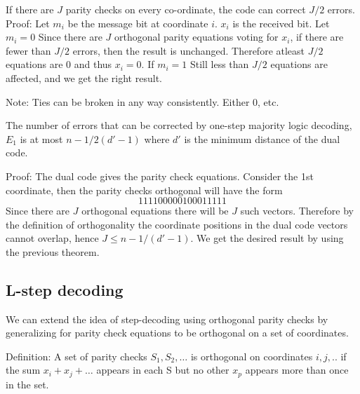 \documentclass{article}
\begin{document}
\begin{Theorem} 
If there are $J$ parity checks on every co-ordinate, the code can correct $J/2$ errors.
Proof: 
Let $m_i$ be the message bit at coordinate $i$. $x_i$ is the received bit. 
Let $m_i=0$
Since there are $J$ orthogonal parity equations voting for $x_i$, if there are fewer than $J/2$ errors, then the result is unchanged. Therefore atleast $J/2$ equations are $0$ and thus $x_i=0$.
If $m_i=1$
Still less than $J/2$ equations are affected, and we get the right result.
\end{Theorem}

Note: Ties can be broken in any way consistently. Either $0$, etc.

\begin{Theorem}
The number of errors that can be corrected by one-step majority logic decoding, $E_1$ is at most $n-1/2(d'-1)$ where $d'$ is the minimum distance of the dual code.

Proof: The dual code gives the parity check equations. 
Consider the 1st coordinate, then the parity checks orthogonal will have the form
\begin{equation*}
1  1 1 1  0 0 0 0 0
1  0 0 0  1 1 1 1 1 
\end{equation*}
Since there are $J$ orthogonal equations there will be $J$ such vectors.
Therefore by the definition of orthogonality the coordinate positions in the dual code vectors cannot overlap, hence $J \leq n-1/(d'-1) $.
We get the desired result by using the previous theorem.
\end{Theorem}

\subsection{L-step decoding}
We can extend the idea of step-decoding using orthogonal parity checks by generalizing for parity check equations to be orthogonal on a set of coordinates. 

Definition: A set of parity checks $S_1, S_2,\ldots$ is orthogonal on coordinates $i,j,..$ if the sum $x_i+x_j+\ldots$ appears in each S but no other $x_p$ appears more than once in the set.
\end{document}
